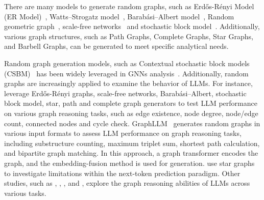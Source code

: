 There are many models to generate random graphs, such as Erdős-Rényi Model (ER Model)~\citep{erdds1959random}, Watts–Strogatz model~\citep{watts1998collective}, Barabási–Albert model~\cite{albert2002statistical}, Random geometric graph~\cite{cannings2005random}, scale-free networks~\citep{barabasi1999emergence} and stochastic block model~\cite{holland1983stochastic}. Additionally, various graph structures, such as Path Graphs, Complete Graphs, Star Graphs, and Barbell Graphs, can be generated to meet specific analytical needs.

Random graph generation models, such as Contextual stochastic block models (CSBM)~\citep{deshpande2018contextual} has been widely leveraged in GNNs analysis~\citep{baranwal2021graph, ma2021homophily, mao2024demystifying, han2024node}. Additionally, random graphs are increasingly applied to examine the behavior of LLMs. For instance, \citet{fatemi2023talk} leverage Erdős-Rényi graphs, scale-free networks, Barabási–Albert, stochastic block model, star, path and complete graph generators to test LLM performance on various graph reasoning tasks, such as edge existence, node degree, node/edge count, connected nodes and cycle check.
GraphLLM~\citep{chai2023graphllm} generates random graphs in various input formats to assess LLM performance on graph reasoning tasks, including substructure counting, maximum triplet sum, shortest path calculation, and bipartite graph matching. In this approach, a graph transformer encodes the graph, and the embedding-fusion method is used for generation. \citet{bachmann2024pitfalls} use star graphs to investigate limitations within the next-token prediction paradigm. Other studies, such as \citet{dai2024revisiting}, \citet{wang2024can}, \citet{guo2023gpt4graph}, and \citet{luo2024graphinstruct}, explore the graph reasoning abilities of LLMs across various tasks.


